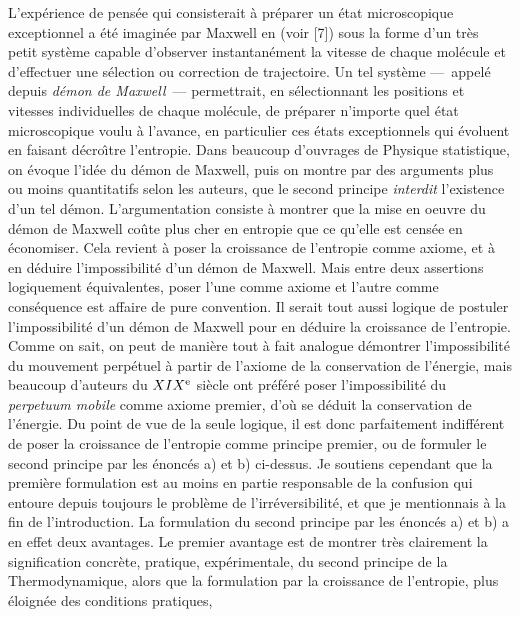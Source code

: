 \medskip
L'exp\'erience de pens\'ee qui consisterait \`a pr\'eparer un \'etat 
microscopique exceptionnel a \'et\'e imagin\'ee par Maxwell en 
{} (voir [7]) sous la 
forme d'un tr\`es petit syst\`eme capable d'observer instantan\'ement 
la vitesse de chaque mol\'ecule et d'effectuer une s\'election ou 
correction de trajectoire.  Un tel syst\`eme ---~appel\'e depuis 
{\it d\'emon de Maxwell}~--- permettrait, en s\'electionnant les positions 
et vitesses individuelles de chaque mol\'ecule, de pr\'eparer n'importe 
quel \'etat microscopique voulu \`a l'avance, en particulier ces \'etats 
exceptionnels qui \'evoluent en faisant d\'ecro{\^\i}tre l'entropie.
\medskip
Dans beaucoup d'ouvrages de Physique statistique, on \'evoque l'id\'ee 
du d\'emon de Maxwell,  puis on montre par des arguments plus ou moins 
quantitatifs selon les auteurs, que le second principe {\it interdit} 
l'existence d'un tel d\'emon. L'argumentation consiste \`a montrer que 
la mise en oeuvre du d\'emon de Maxwell co\^ute plus cher en entropie 
que ce qu'elle est cens\'ee en \'economiser. Cela revient \`a poser la 
croissance de l'entropie comme axiome, et \`a en d\'eduire l'impossibilit\'e 
d'un d\'emon de Maxwell. Mais entre deux assertions logiquement 
\'equivalentes, poser l'une comme axiome et l'autre comme cons\'equence 
est affaire de pure convention. Il serait tout aussi logique de 
postuler l'impossibilit\'e d'un d\'emon de Maxwell pour en d\'eduire 
la croissance de l'entropie. Comme on sait, on peut de mani\`ere tout 
\`a fait analogue d\'emontrer l'impossibilit\'e du mouvement perp\'etuel 
\`a partir de l'axiome de la conservation de l'\'energie, mais beaucoup 
d'auteurs du $XIX^{\rm e}$ si\`ecle ont pr\'ef\'er\'e poser 
l'impossibilit\'e du {\it perpetuum mobile} comme axiome premier,  
d'o\`u se d\'eduit la conservation de l'\'energie. 
\medskip 
Du point de vue de la seule logique, il est donc parfaitement 
indiff\'erent de poser la croissance de l'entropie comme principe premier, 
ou de formuler le second principe par les \'enonc\'es a) et b) ci-dessus.
Je soutiens cependant que la premi\`ere formulation est au moins en 
partie responsable de la confusion qui entoure depuis toujours le 
probl\`eme de l'irr\'eversibilit\'e, et que je mentionnais \`a la fin de 
l'introduction. La formulation du second principe par les \'enonc\'es 
a) et b) a en effet deux avantages. Le premier avantage est de montrer 
tr\`es clairement la signification concr\`ete, pratique, exp\'erimentale, 
du second principe de la Thermodynamique, alors que la formulation par la 
croissance de l'entropie, plus \'eloign\'ee des conditions pratiques, 

